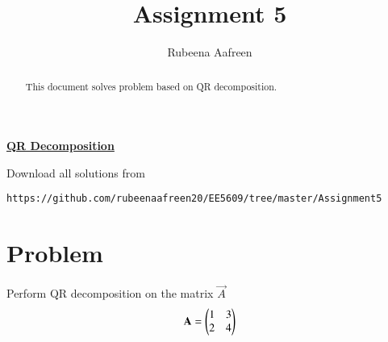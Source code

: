 \documentclass[journal,12pt,twocolumn]{IEEEtran}
\begin{document}
 \vspace{3cm}
 \title{Assignment 5}
 \author{Rubeena Aafreen}
 \maketitle
 \newpage
 \bigskip
 \renewcommand{\thetable}{\theenumi}
\vspace{1.0cm}
\vspace{2ex}
\begin{center}
{\underline{\Large \bf QR Decomposition}}
\end{center}
\begin{abstract}
This document solves problem based on QR decomposition.
\end{abstract}
\vspace{0.5cm}
%
Download all solutions from 
\begin{lstlisting}
https://github.com/rubeenaafreen20/EE5609/tree/master/Assignment5
\end{lstlisting}
%
%
\vspace{0.5mm}
\section{Problem}
Perform QR decomposition on the matrix $\vec{A}$ 
\begin{align}
\mathbf{A}=\begin{pmatrix}1&3\\2&4\end{pmatrix} \label{eq:1}
\end{align}
\end{document}
